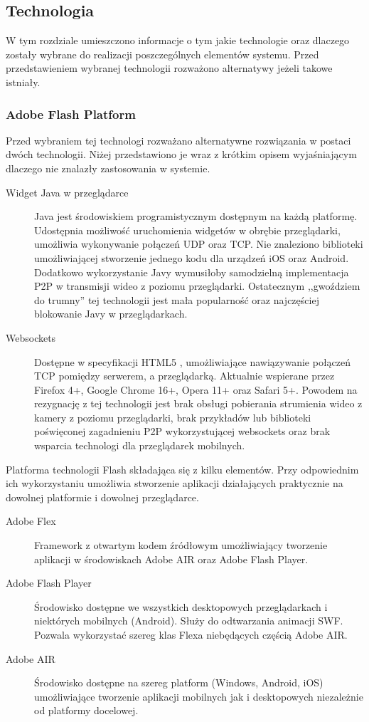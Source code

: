 \subsection{Technologia}
\label{sec:EtapItechnologia}

W tym rozdziale umieszczono informacje o tym jakie technologie oraz dlaczego zostały wybrane do realizacji poszczególnych elementów systemu. Przed przedstawieniem wybranej technologii rozważono alternatywy jeżeli takowe istniały.

\subsubsection{Adobe Flash Platform}
\label{sec:EtapItechnologiaAFP}

Przed wybraniem tej technologi rozważano alternatywne rozwiązania w postaci dwóch technologii. Niżej przedstawiono je wraz z krótkim opisem wyjaśniającym dlaczego nie znalazły zastosowania w systemie.
\begin{description}
    \item[Widget Java w przeglądarce] Java jest środowiskiem programistycznym dostępnym na każdą platformę. Udostępnia możliwość uruchomienia widgetów w obrębie przeglądarki, umożliwia wykonywanie połączeń UDP oraz TCP. Nie znaleziono biblioteki umożliwiającej stworzenie jednego kodu dla urządzeń iOS oraz Android. Dodatkowo wykorzystanie Javy wymusiłoby samodzielną implementacja P2P w transmisji wideo z poziomu przeglądarki. Ostatecznym ,,gwoździem do trumny'' tej technologii jest mała popularność oraz najczęściej blokowanie Javy w przeglądarkach.
    \item[Websockets] Dostępne w specyfikacji HTML5 \cite{rfc6455}, umożliwiające nawiązywanie połączeń TCP pomiędzy serwerem, a przeglądarką. Aktualnie wspierane przez  Firefox 4+, Google Chrome 16+, Opera 11+ oraz Safari 5+. Powodem na rezygnację z tej technologii jest brak obsługi pobierania strumienia wideo z kamery z poziomu przeglądarki, brak przykładów lub biblioteki poświęconej zagadnieniu P2P wykorzystującej websockets oraz brak wsparcia technologi dla przeglądarek mobilnych.
\end{description}

Platforma technologii Flash składająca się z kilku elementów. Przy odpowiednim ich wykorzystaniu umożliwia stworzenie aplikacji działających praktycznie na dowolnej platformie i dowolnej przeglądarce.

\begin{description}
    \item[Adobe Flex] Framework z otwartym kodem źródłowym umożliwiający tworzenie aplikacji w środowiskach Adobe AIR oraz Adobe Flash Player.
    \item[Adobe Flash Player] Środowisko dostępne we wszystkich desktopowych przeglądarkach i niektórych mobilnych (Android). Służy do odtwarzania animacji SWF. Pozwala wykorzystać szereg klas Flexa niebędących częścią Adobe AIR.
    \item[Adobe AIR] Środowisko dostępne na szereg platform (Windows, Android, iOS) umożliwiające tworzenie aplikacji mobilnych jak i desktopowych niezależnie od platformy docelowej.
\end{description}

